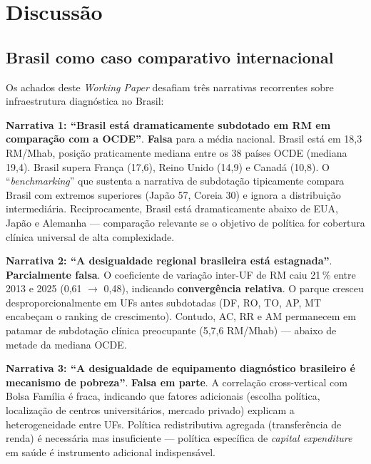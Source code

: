 \documentclass[12pt,a4paper,oneside]{article}
\begin{document}
\section{Discussão}\label{sec:discussao}

\subsection{Brasil como caso comparativo internacional}

Os achados deste \textit{Working Paper} desafiam três narrativas
recorrentes sobre infraestrutura diagnóstica no Brasil:

\textbf{Narrativa 1: ``Brasil está dramaticamente subdotado em
RM em comparação com a OCDE''}. \textbf{Falsa} para a média nacional.
Brasil está em 18,3 RM/Mhab, posição praticamente mediana entre os
38 países OCDE (mediana 19,4). Brasil supera França (17,6),
Reino Unido (14,9) e Canadá (10,8). O ``\textit{benchmarking}'' que
sustenta a narrativa de subdotação tipicamente compara Brasil com
extremos superiores (Japão 57, Coreia 30) e ignora a distribuição
intermediária. Reciprocamente, Brasil está dramaticamente abaixo de
EUA, Japão e Alemanha — comparação relevante se o objetivo de
política for cobertura clínica universal de alta complexidade.

\textbf{Narrativa 2: ``A desigualdade regional brasileira está
estagnada''}. \textbf{Parcialmente falsa}. O coeficiente de variação
inter-UF de RM caiu 21\,\% entre 2013 e 2025 (0,61 $\rightarrow$
0,48), indicando \textbf{convergência relativa}. O parque cresceu
desproporcionalmente em UFs antes subdotadas (DF, RO, TO, AP, MT
encabeçam o ranking de crescimento). Contudo, AC, RR e AM permanecem
em patamar de subdotação clínica preocupante (5,7,6
RM/Mhab) — abaixo de metade da mediana OCDE.

\textbf{Narrativa 3: ``A desigualdade de equipamento diagnóstico
brasileiro é mecanismo de pobreza''}. \textbf{Falsa em parte}. A
correlação cross-vertical com Bolsa Família é fraca, indicando que
fatores adicionais (escolha política, localização de centros
universitários, mercado privado) explicam a heterogeneidade entre
UFs. Política redistributiva agregada (transferência de renda) é
necessária mas insuficiente — política específica de
\textit{capital expenditure} em saúde é instrumento adicional
indispensável.
\end{document}
